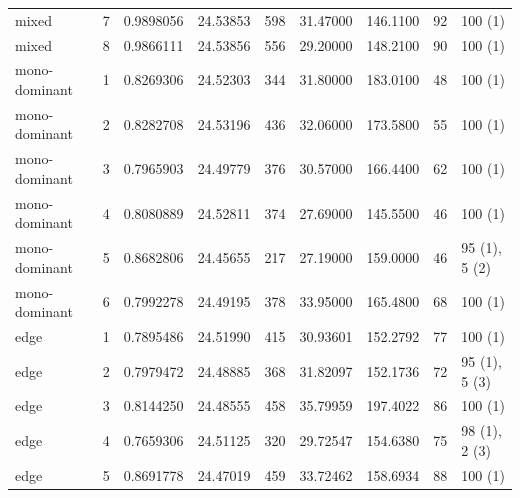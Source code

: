 \documentclass[landscape]{article}
\begin{document}
\begin{table}[!h]
\begin{tabular}[t]{lrrrrrrrl}
mixed & 7 & 0.9898056 & 24.53853 & 598 & 31.47000 & 146.1100 & 92 & 100 (1)\\
mixed & 8 & 0.9866111 & 24.53856 & 556 & 29.20000 & 148.2100 & 90 & 100 (1)\\
mono-dominant & 1 & 0.8269306 & 24.52303 & 344 & 31.80000 & 183.0100 & 48 & 100 (1)\\
\addlinespace
mono-dominant & 2 & 0.8282708 & 24.53196 & 436 & 32.06000 & 173.5800 & 55 & 100 (1)\\
mono-dominant & 3 & 0.7965903 & 24.49779 & 376 & 30.57000 & 166.4400 & 62 & 100 (1)\\
mono-dominant & 4 & 0.8080889 & 24.52811 & 374 & 27.69000 & 145.5500 & 46 & 100 (1)\\
mono-dominant & 5 & 0.8682806 & 24.45655 & 217 & 27.19000 & 159.0000 & 46 & 95 (1), 5 (2)\\
mono-dominant & 6 & 0.7992278 & 24.49195 & 378 & 33.95000 & 165.4800 & 68 & 100 (1)\\
\addlinespace
edge & 1 & 0.7895486 & 24.51990 & 415 & 30.93601 & 152.2792 & 77 & 100 (1)\\
edge & 2 & 0.7979472 & 24.48885 & 368 & 31.82097 & 152.1736 & 72 & 95 (1), 5 (3)\\
edge & 3 & 0.8144250 & 24.48555 & 458 & 35.79959 & 197.4022 & 86 & 100 (1)\\
edge & 4 & 0.7659306 & 24.51125 & 320 & 29.72547 & 154.6380 & 75 & 98 (1), 2 (3)\\
edge & 5 & 0.8691778 & 24.47019 & 459 & 33.72462 & 158.6934 & 88 & 100 (1)\\
\bottomrule
\end{tabular}
\end{table}
\end{document}
